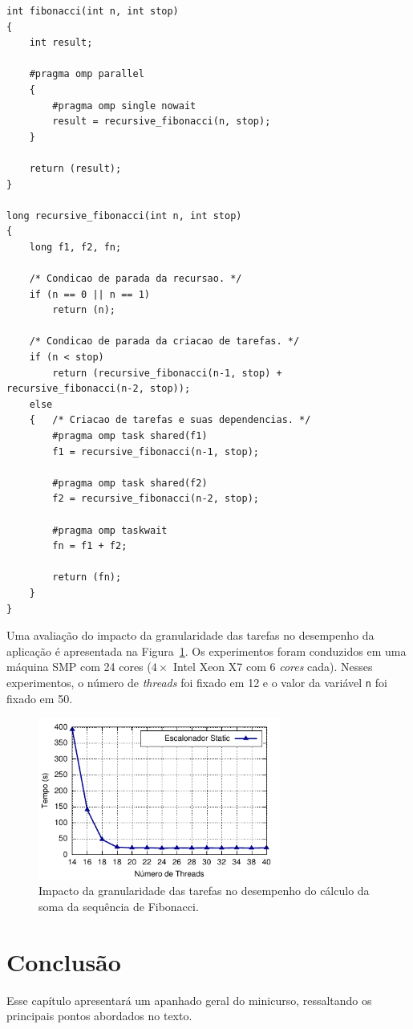 \documentclass{SBCbookchapter}
\begin{document}
\begin{lstlisting}[frame=single, caption=Exemplo de uma implementação recursiva simples da soma da sequencia de Fibonacci
usando tarefas., label=listing:fibonacci]
int fibonacci(int n, int stop)
{
	int result;
	
	#pragma omp parallel
  	{
		#pragma omp single nowait
		result = recursive_fibonacci(n, stop);
	}
		
	return (result);
}

long recursive_fibonacci(int n, int stop)
{
	long f1, f2, fn;

	/* Condicao de parada da recursao. */
	if (n == 0 || n == 1) 
		return (n);

	/* Condicao de parada da criacao de tarefas. */
	if (n < stop) 
		return (recursive_fibonacci(n-1, stop) + recursive_fibonacci(n-2, stop));
	else
	{	/* Criacao de tarefas e suas dependencias. */
		#pragma omp task shared(f1)
		f1 = recursive_fibonacci(n-1, stop);

		#pragma omp task shared(f2)
		f2 = recursive_fibonacci(n-2, stop);
		
		#pragma omp taskwait
		fn = f1 + f2;
			
		return (fn);
	}
}
\end{lstlisting}

	Uma avaliação do impacto da granularidade das tarefas no desempenho da aplicação é apresentada na
	Figura~\ref{fig:grao-tarefas}. Os experimentos foram conduzidos em uma máquina SMP com 24 cores
	($4 \times$ Intel Xeon X7 com 6 \textit{cores} cada). Nesses experimentos, o número de \textit{threads} foi fixado
	em 12 e o valor da variável \texttt{n} foi fixado em 50.

	\begin{figure}[t]
		\centering
		\includegraphics[width=8cm, height=!]{img/fibonacci-task-grain}
		\caption{Impacto da granularidade das tarefas no desempenho do cálculo da soma da sequência
		de Fibonacci.}
		\label{fig:grao-tarefas}
	\end{figure}

\section{Conclusão}
\label{sec:conclusao}

	Esse capítulo apresentará um apanhado geral do minicurso, ressaltando os
	principais pontos abordados no texto.


\end{document}
